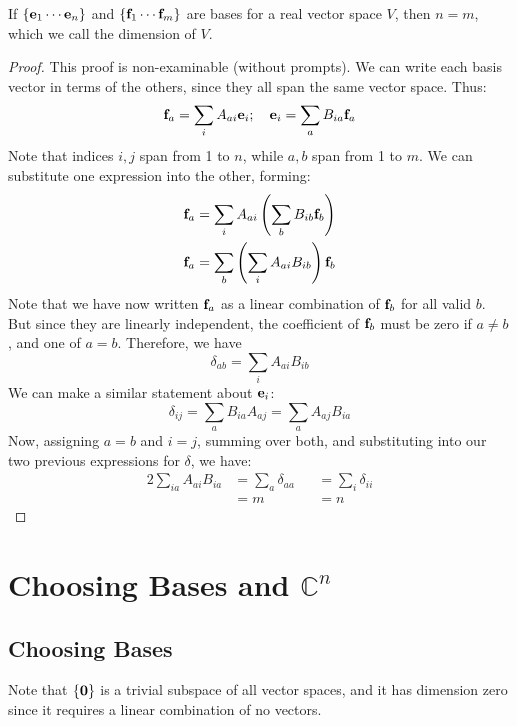 \documentclass{article}
\begin{document}
\begin{theorem}
    If $\{\vb e_1 \cdots \vb e_n \}$ and $\{ \vb f_1 \cdots \vb f_m \}$ are bases for a real vector space $V$, then $n=m$, which we call the dimension of $V$.
\end{theorem}
\begin{proof}
    This proof is non-examinable (without prompts). We can write each basis vector in terms of the others, since they all span the same vector space. Thus:
    \[ \vb f_a = \sum_i A_{ai} \vb e_i;\quad \vb e_i = \sum_a B_{ia} \vb f_a \]
    Note that indices $i,j$ span from 1 to $n$, while $a,b$ span from 1 to $m$. We can substitute one expression into the other, forming:
    \begin{align*}
        \vb f_a & = \sum_i A_{ai} \left( \sum_b B_{ib}\vb f_b \right)  \\
        \vb f_a & = \sum_b \left( \sum_i A_{ai} B_{ib} \right) \vb f_b
    \end{align*}
    Note that we have now written $\vb f_a$ as a linear combination of $\vb f_b$ for all valid $b$. But since they are linearly independent, the coefficient of $\vb f_b$ must be zero if $a \neq b$, and one of $a = b$. Therefore, we have
    \[ \delta_{ab} = \sum_i A_{ai} B_{ib} \]
    We can make a similar statement about $\vb e_i$:
    \[ \delta_{ij} = \sum_a B_{ia} A_{aj} = \sum_a A_{aj} B_{ia} \]
    Now, assigning $a=b$ and $i=j$, summing over both, and substituting into our two previous expressions for $\delta$, we have:
    \begin{alignat}{2}
        \sum_{ia} A_{ai} B_{ia} & = \sum_a \delta_{aa} &  & = \sum_i \delta_{ii} \\
                                & = m                  &  & = n
    \end{alignat}
\end{proof}

\section{Choosing Bases and $\mathbb C^n$}
\subsection{Choosing Bases}
Note that $\{ \vb 0 \}$ is a trivial subspace of all vector spaces, and it has dimension zero since it requires a linear combination of no vectors.
\end{document}
